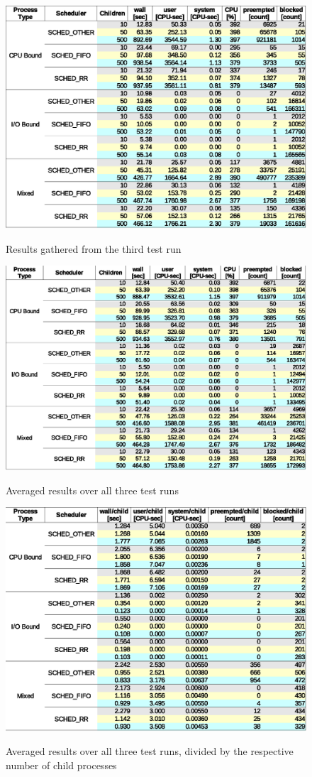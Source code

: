 \begin{figure}[hbtp]
  \centering
  \caption{Results gathered from the third test run}
  \includegraphics[scale=1.0]{img/raw-results3-table.eps}
  \label{tab:raw-results3}
\end{figure}

\begin{figure}[hbtp]
  \centering
  \caption{Averaged results over all three test runs}
  \includegraphics[scale=1.0]{img/raw-results-table.eps}
  \label{tab:raw-results}
\end{figure}

\begin{figure}[hbtp]
  \centering
  \caption{Averaged results over all three test runs, divided by the respective number of child processes}
  \includegraphics[scale=1.0]{img/raw-results-child-table.eps}
  \label{tab:raw-results-child}
\end{figure}

